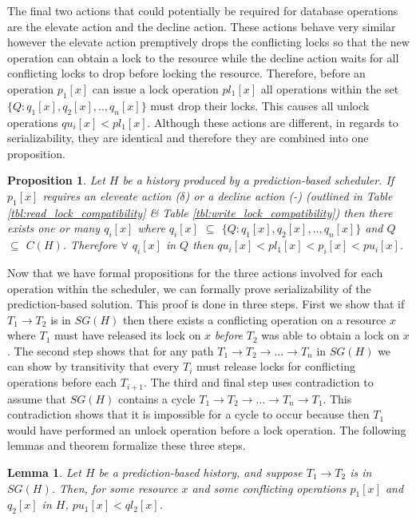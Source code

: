 \documentclass[conference]{IEEEtran}
\newtheorem{lemma}[theorem]{Lemma}
\newtheorem{proposition}{Proposition}
\begin{document}
The final two actions that could potentially be required for database operations are the elevate action and the decline action. These actions behave very similar however the elevate action premptively drops the conflicting locks so that the new operation can obtain a lock to the resource while the decline action waits for all conflicting locks to drop before locking the resource. Therefore, before an operation $p_{1}[x]$ can issue a lock operation $pl_{1}[x]$ all operations within the set $\{Q:q_{1}[x],q_{2}[x],..,q_{n}[x]\}$ must drop their locks. This causes all unlock operations $qu_{i}[x] < pl_{1}[x]$. Although these actions are different, in regards to serializability, they are identical and therefore they are combined into one proposition. 

\begin{proposition}
\label{prop:elevate_decline}
Let $H$ be a history produced by a prediction-based scheduler. If $p_{1}[x]$ requires an eleveate action ($\delta$) or a decline action (-) (outlined in Table \ref{tbl:read_lock_compatibility} \& Table \ref{tbl:write_lock_compatibility}) then there exists one or many $q_{i}[x]$ where $q_{i}[x]$ $\subseteq$ $\{Q:q_{1}[x],q_{2}[x],..,q_{n}[x]\}$ and $Q$ $\subseteq$ $C(H)$. Therefore $\forall$ $q_{i}[x]$ in $Q$ then $qu_{i}[x] < pl_{1}[x] < p_{i}[x] < pu_{i}[x]$.
\end{proposition}

Now that we have formal propositions for the three actions involved for each operation within the scheduler, we can formally prove serializability of the prediction-based solution. This proof is done in three steps. First we show that if $T_{1} \rightarrow T_{2}$ is in $SG(H)$ then there exists a conflicting operation on a resource $x$ where $T_{1}$ must have released its lock on $x$ \textit{before} $T_{2}$ was able to obtain a lock on $x$. The second step shows that for any path $T_{1} \rightarrow T_{2} \rightarrow ... \rightarrow T_{n}$ in $SG(H)$ we can show by transitivity that every $T_{i}$ must release locks for conflicting operations before each $T_{i+1}$. The third and final step uses contradiction to assume that $SG(H)$ contains a cycle $T_{1} \rightarrow T_{2} \rightarrow ... \rightarrow T_{n} \rightarrow T_{1}$. This contradiction shows that it is impossible for a cycle to occur because then $T_{1}$ would have performed an unlock operation before a lock operation. The following lemmas and theorem formalize these three steps.

\begin{lemma}
\label{lemma1}
Let $H$ be a prediction-based history, and suppose $T_{1} \rightarrow T_{2}$ is in $SG(H)$. Then, for some resource $x$ and some conflicting operations $p_{1}[x]$ and $q_{2}[x]$ in $H$, $pu_{1}[x] < ql_{2}[x]$.
\end{lemma}
\end{document}

